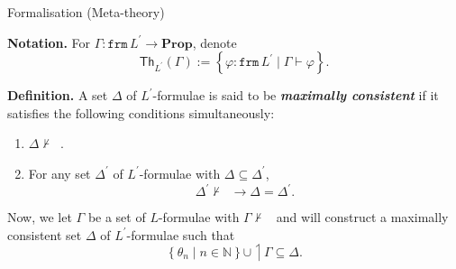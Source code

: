 \documentclass[serif,table,10pt]{beamer}
\newcommand{\IN}{\mathbb{N}}
\newcommand{\0}{\texttt{0}}
\newcommand{\1}{\texttt{1}}
\newcommand{\embed}[1]{{\upharpoonleft} {#1}}
\newcommand{\inlinedef}[1]{\emph{\textbf{#1}}}
\newcommand{\Prop}{\mathbf{Prop}}
\newcommand{\Lbot}{\mathop{\dot{\bot}}}
\begin{document}
\begin{frame}{Formalisation (Meta-theory)}

    \textbf{Notation.}
    For $\Gamma : \mathtt{frm} \, L^\prime \to \Prop$, denote $$ \mathsf{Th}_{L^\prime} ( \Gamma ) := \left\{ \varphi : \mathtt{frm} \, L^\prime \mid \Gamma \vdash \varphi \right\} . $$

    \textbf{Definition.}
    A set $\Delta$ of $L^\prime$-formulae is said to be \inlinedef{maximally consistent} if it satisfies the following conditions simultaneously:
    \begin{enumerate}
        \item $\Delta \nvdash \Lbot$.
        \item For any set $\Delta^\prime$ of $L^\prime$-formulae with $ \Delta \subseteq \Delta^\prime $, $$ \Delta^\prime \nvdash \Lbot \to \Delta = \Delta^\prime . $$
    \end{enumerate}

    Now, we let $\Gamma$ be a set of $L$-formulae with $\Gamma \nvdash \Lbot$ and will construct a maximally consistent set $\Delta$ of $L^\prime$-formulae such that $$\left\{ \theta_n \mid n \in \IN \right\} \cup \embed{\Gamma} \subseteq \Delta .$$

\end{frame}
\end{document}
